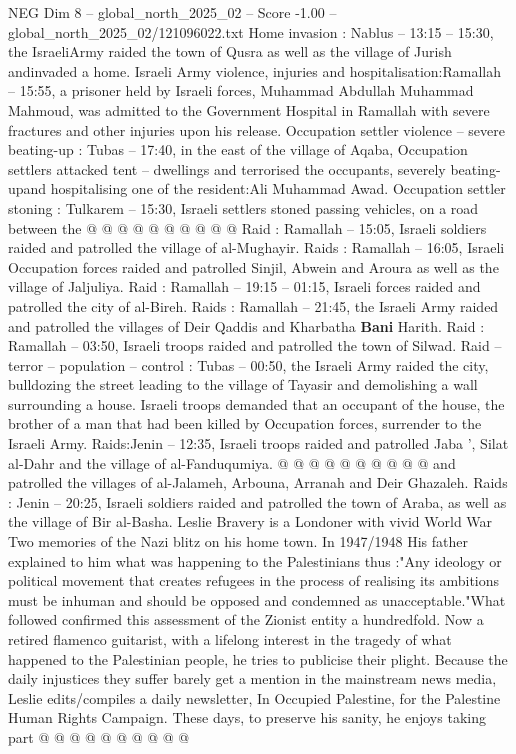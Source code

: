 \begin{textsample}{NEG Dim 8 – global\_north\_2025\_02 – Score -1.00 – global\_north\_2025\_02/121096022.txt}
Home invasion : Nablus -- 13:15 -- 15:30, the IsraeliArmy raided the town of Qusra as well as the village of Jurish andinvaded a home.
Israeli Army violence, injuries and hospitalisation:Ramallah -- 15:55, a prisoner held by Israeli forces, Muhammad Abdullah Muhammad Mahmoud, was admitted to the Government Hospital in Ramallah with severe fractures and other injuries upon his release.
Occupation settler violence -- severe beating-up : Tubas -- 17:40, in the east of the village of Aqaba, Occupation settlers attacked tent -- dwellings and terrorised the occupants, severely beating-upand hospitalising one of the resident:Ali Muhammad Awad.
Occupation settler stoning : Tulkarem -- 15:30, Israeli settlers stoned passing vehicles, on a road between the @ @ @ @ @ @ @ @ @ @ Raid : Ramallah -- 15:05, Israeli soldiers raided and patrolled the village of al-Mughayir.
Raids : Ramallah -- 16:05, Israeli Occupation forces raided and patrolled Sinjil, Abwein and Aroura as well as the village of Jaljuliya.
Raid : Ramallah -- 19:15 -- 01:15, Israeli forces raided and patrolled the city of al-Bireh.
Raids : Ramallah -- 21:45, the Israeli Army raided and patrolled the villages of Deir Qaddis and Kharbatha \textbf{Bani} Harith.
Raid : Ramallah -- 03:50, Israeli troops raided and patrolled the town of Silwad.
Raid -- terror -- population -- control : Tubas -- 00:50, the Israeli Army raided the city, bulldozing the street leading to the village of Tayasir and demolishing a wall surrounding a house.
Israeli troops demanded that an occupant of the house, the brother of a man that had been killed by Occupation forces, surrender to the Israeli Army.
Raids:Jenin -- 12:35, Israeli troops raided and patrolled Jaba ', Silat al-Dahr and the village of al-Fanduqumiya. @ @ @ @ @ @ @ @ @ @ and patrolled the villages of al-Jalameh, Arbouna, Arranah and Deir Ghazaleh.
Raids : Jenin -- 20:25, Israeli soldiers raided and patrolled the town of Araba, as well as the village of Bir al-Basha.
Leslie Bravery is a Londoner with vivid World War Two memories of the Nazi blitz on his home town.
In 1947/1948 His father explained to him what was happening to the Palestinians thus :"Any ideology or political movement that creates refugees in the process of realising its ambitions must be inhuman and should be opposed and condemned as unacceptable."What followed confirmed this assessment of the Zionist entity a hundredfold.
Now a retired flamenco guitarist, with a lifelong interest in the tragedy of what happened to the Palestinian people, he tries to publicise their plight.
Because the daily injustices they suffer barely get a mention in the mainstream news media, Leslie edits/compiles a daily newsletter, In Occupied Palestine, for the Palestine Human Rights Campaign.
These days, to preserve his sanity, he enjoys taking part @ @ @ @ @ @ @ @ @ @

\end{textsample}
